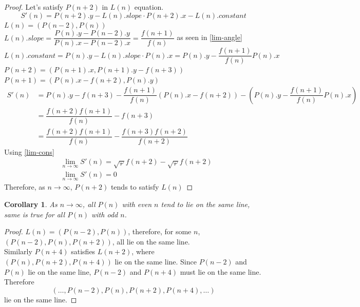 \documentclass{article}
\newtheorem{corollary}{Corollary}[theorem]
\begin{document}
\begin{proof}
	Let's satisfy $P(n+2)$ in $L(n)$ equation.
	$$S'(n) = P(n+2).y - L(n).slope \cdot P(n+2).x - L(n).constant$$
	$L(n) = (P(n-2), P(n))$\\
	$L(n).slope = \dfrac{P(n).y-P(n-2).y}{P(n).x-P(n-2).x} = \dfrac{f(n+1)}{f(n)}$ as seen in \ref{lim-angle}\\
	$L(n).constant = P(n).y - L(n).slope \cdot P(n).x = P(n).y - \dfrac{f(n+1)}{f(n)} P(n).x$\\
	$P(n+2) = (P(n+1).x, P(n+1).y-f(n+3))$\\
	$P(n+1) = (P(n).x - f(n+2), P(n).y)$
	\begin{align*}
		S'(n) &= P(n).y - f(n+3)-\dfrac{f(n+1)}{f(n)}(P(n).x-f(n+2))-\left(P(n).y-\dfrac{f(n+1)}{f(n)}P(n).x\right)\\
		&= \dfrac{f(n+2)f(n+1)}{f(n)}-f(n+3)\\
		&= \dfrac{f(n+2)f(n+1)}{f(n)}-\dfrac{f(n+3)f(n+2)}{f(n+2)}
	\end{align*}
	Using \ref{lim-cons}
	\begin{align*}
		&\lim_{n \to \infty} S'(n) = \sqrt{\varphi}f(n+2) - \sqrt{\varphi}f(n+2)\\
		&\lim_{n \to \infty} S'(n) = 0
	\end{align*}
	Therefore, as $n\to\infty$, $P(n+2)$ tends to satisfy $L(n)$
\end{proof}
\begin{corollary}
	As $n \to \infty$, all $P(n)$ with even $n$ tend to lie on the same line, same is true for all $P(n)$ with odd $n$.
\end{corollary}
\begin{proof}
	$L(n) = (P(n-2), P(n))$, therefore, for some $n$, $(P(n-2), P(n), P(n+2))$, all lie on the same line.\\
	Similarly $P(n+4)$ satisfies $L(n+2)$, where $(P(n), P(n+2), P(n+4))$ lie on the same line. Since $P(n-2)$ and $P(n)$ lie on the same line, $P(n-2)$ and $P(n+4)$ must lie on the same line.\\
	Therefore $$(\ldots, P(n-2), P(n), P(n+2), P(n+4),\ldots)$$ lie on the same line.
\end{proof}
\end{document}
